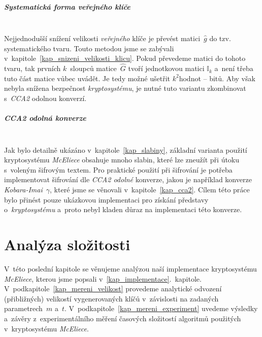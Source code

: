 \documentclass[thesis=M,czech,hidelinks]{FITthesis}[2012/06/26]
\newcommand{\0}{{\textcolor[gray]{0.75}{0}}}
\begin{document}
\paragraph{Systematická forma veřejného klíče} \hfil \\
Nejjednodušší snížení velikosti \emph{veřejného} klíče je převést
matici~$\hat{g}$ do tzv. systematického tvaru. Touto metodou jsme se zabývali
v~kapitole~\ref{kap_snizeni_velikosti_klicu}. Pokud převedeme matici do tohoto
tvaru, tak prvních $k$~sloupců matice~$\hat{G}$ tvoří jednotkovou matici
$\mathbb{I}_k$ a~není třeba tuto část matice vůbec uvádět. Je tedy možné ušetřit
$k^2$\;hodnot -- bitů. Aby však nebyla snížena bezpečnost \emph{kryptosystému},
je nutné tuto variantu zkombinovat s~\emph{CCA2} odolnou konverzí.


\paragraph{CCA2 odolná konverze} \hfil \\
Jak bylo detailně ukázáno v~kapitole~\ref{kap_slabiny}, základní varianta
použití kryptosystému \emph{McEliece} obsahuje mnoho slabin, které lze zneužít
při útoku s~voleným šifrovým textem. Pro praktické použití při šifrování je
potřeba implementovat šifrování dle \emph{CCA2 odolné} konverze, jakou je
například konverze \emph{Kobara-Imai}~$\gamma$, které jsme se věnovali
v~kapitole~\ref{kap_cca2}. Cílem této práce bylo přinést pouze ukázkovou
implementaci pro získání představy o~\emph{kryptosystému} a~proto nebyl kladen
důraz na implementaci této konverze.




\chapter{Analýza složitosti}\label{kap_analyza_slozitosti}


V~této poslední kapitole se věnujeme analýzou naší implementace kryptosystému
\emph{McEliece}, kterou jsme popsali v~\ref{kap_implementace}.~kapitole.
V~podkapitole~\ref{kap_mereni_velikost} provedeme analytické odvození
(přibližných) velikostí vygenerovaných klíčů v~závislosti na zadaných
parametrech~$m$ a~$t$. V~podkapitole~\ref{kap_mereni_experiment} uvedeme
výsledky a~závěry z~experimentálního měření časových složitostí algoritmů
použitých v~kryptosystému \emph{McEliece}.
\end{document}
